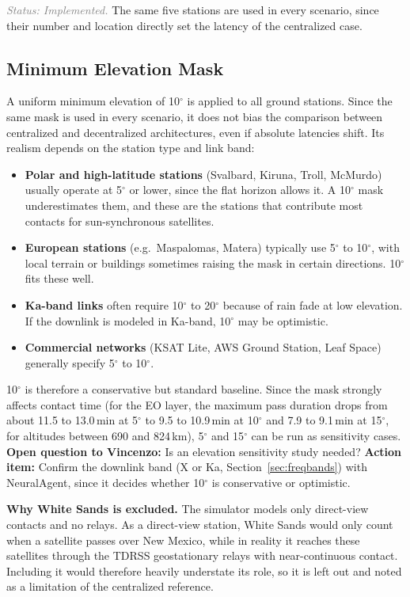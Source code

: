 \documentclass[11pt]{article}
\newcommand{\vincenzoq}[1]{\textcolor{vincenzoq}{\textbf{Open question to Vincenzo:}} #1}
\newcommand{\actionitem}[1]{\textcolor{todo}{\textbf{Action item:}} #1}
\newcommand{\status}[1]{\textit{\textcolor{gray}{Status: #1}}}
\begin{document}
\status{Implemented.} The same five stations are used in every scenario, since their number and location directly set the latency of the centralized case.

\subsection{Minimum Elevation Mask}\label{subsec:elev}

A uniform minimum elevation of 10$^\circ$ is applied to all ground stations. Since the same mask is used in every scenario, it does not bias the comparison between centralized and decentralized architectures, even if absolute latencies shift. Its realism depends on the station type and link band:
\begin{itemize}[leftmargin=1.2cm]
    \item \textbf{Polar and high-latitude stations} (Svalbard, Kiruna, Troll, McMurdo) usually operate at 5$^\circ$ or lower, since the flat horizon allows it. A 10$^\circ$ mask underestimates them, and these are the stations that contribute most contacts for sun-synchronous satellites.
    \item \textbf{European stations} (e.g.\ Maspalomas, Matera) typically use 5$^\circ$ to 10$^\circ$, with local terrain or buildings sometimes raising the mask in certain directions. 10$^\circ$ fits these well.
    \item \textbf{Ka-band links} often require 10$^\circ$ to 20$^\circ$ because of rain fade at low elevation. If the downlink is modeled in Ka-band, 10$^\circ$ may be optimistic.
    \item \textbf{Commercial networks} (KSAT Lite, AWS Ground Station, Leaf Space) generally specify 5$^\circ$ to 10$^\circ$.
\end{itemize}
10$^\circ$ is therefore a conservative but standard baseline. Since the mask strongly affects contact time (for the EO layer, the maximum pass duration drops from about 11.5 to 13.0\,min at 5$^\circ$ to 9.5 to 10.9\,min at 10$^\circ$ and 7.9 to 9.1\,min at 15$^\circ$, for altitudes between 690 and 824\,km), 5$^\circ$ and 15$^\circ$ can be run as sensitivity cases. \vincenzoq{Is an elevation sensitivity study needed?}
\actionitem{Confirm the downlink band (X or Ka, Section~\ref{sec:freqbands}) with NeuralAgent, since it decides whether 10$^\circ$ is conservative or optimistic.}

\textbf{Why White Sands is excluded.} The simulator models only direct-view contacts and no relays. As a direct-view station, White Sands would only count when a satellite passes over New Mexico, while in reality it reaches these satellites through the TDRSS geostationary relays with near-continuous contact. Including it would therefore heavily understate its role, so it is left out and noted as a limitation of the centralized reference.
\end{document}
